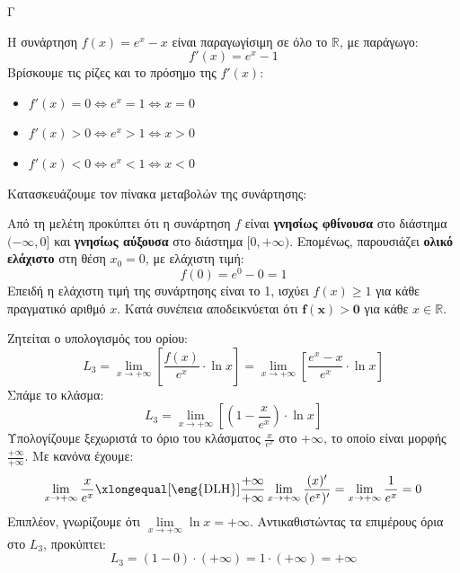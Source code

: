 \begin{thema}{Γ}
\begin{erwthma}
\item Η συνάρτηση $f(x) = e^x - x$ είναι παραγωγίσιμη σε όλο το $\mathbb{R}$, με παράγωγο:
\[ f'(x) = e^x - 1 \]
Βρίσκουμε τις ρίζες και το πρόσημο της $f'(x)$:
\begin{itemize}
    \item $f'(x) = 0 \Leftrightarrow e^x = 1 \Leftrightarrow x = 0$
    \item $f'(x) > 0 \Leftrightarrow e^x > 1 \Leftrightarrow x > 0$
    \item $f'(x) < 0 \Leftrightarrow e^x < 1 \Leftrightarrow x < 0$
\end{itemize}
Κατασκευάζουμε τον πίνακα μεταβολών της συνάρτησης:
\begin{center}
\end{center}
Από τη μελέτη προκύπτει ότι η συνάρτηση $f$ είναι \textbf{γνησίως φθίνουσα} στο διάστημα $(-\infty, 0]$ και \textbf{γνησίως αύξουσα} στο διάστημα $[0, +\infty)$.
Επομένως, παρουσιάζει \textbf{ολικό ελάχιστο} στη θέση $x_0 = 0$, με ελάχιστη τιμή:
\[ f(0) = e^0 - 0 = 1 \]
Επειδή η ελάχιστη τιμή της συνάρτησης είναι το 1, ισχύει $f(x) \ge 1$ για κάθε πραγματικό αριθμό $x$. 
Κατά συνέπεια αποδεικνύεται ότι $\boldsymbol{f(x) > 0}$ για κάθε $x \in \mathbb{R}$.

\item Ζητείται ο υπολογισμός του ορίου:
\[ L_3 = \lim_{x \to +\infty} \left[ \frac{f(x)}{e^x} \cdot \ln x \right] = \lim_{x \to +\infty} \left[ \frac{e^x - x}{e^x} \cdot \ln x \right] \]
Σπάμε το κλάσμα:
\[ L_3 = \lim_{x \to +\infty} \left[ \left( 1 - \frac{x}{e^x} \right) \cdot \ln x \right] \]
Υπολογίζουμε ξεχωριστά το όριο του κλάσματος $\frac{x}{e^x}$ στο $+\infty$, το οποίο είναι μορφής $\frac{+\infty}{+\infty}$. Με κανόνα  έχουμε:
\[ \lim_{x \to +\infty} \frac{x}{e^x} \xlongequal[\text{\eng{DLH}}]{\frac{+\infty}{+\infty}} \lim_{x \to +\infty} \frac{(x)'}{(e^x)'} = \lim_{x \to +\infty} \frac{1}{e^x} = 0 \]
Επιπλέον, γνωρίζουμε ότι $\lim\limits_{x \to +\infty} \ln x = +\infty$.
Αντικαθιστώντας τα επιμέρους όρια στο $L_3$, προκύπτει:
\[ L_3 = (1 - 0) \cdot (+\infty) = 1 \cdot (+\infty) = \boldsymbol{+\infty} \]
\end{erwthma}
\end{thema}
